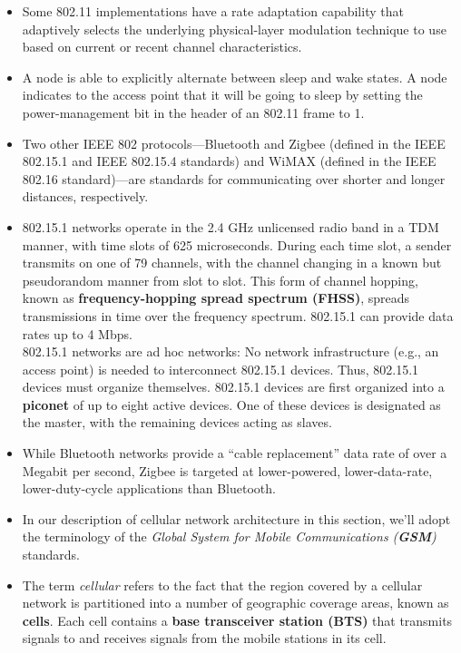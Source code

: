 \begin{itemize}
\item
Some 802.11 implementations have a rate adaptation capability that adaptively selects the underlying physical-layer modulation technique to use based on current or recent channel characteristics.

\item
A node is able to explicitly alternate between sleep and wake states. A node indicates to the access point that it will be going to sleep by setting the power-management bit in the header of an 802.11 frame to 1.

\item
Two other IEEE 802 protocols---Bluetooth and Zigbee (defined in the IEEE 802.15.1 and IEEE 802.15.4 standards) and WiMAX (defined in the IEEE 802.16 standard)---are standards for communicating over shorter and longer distances, respectively.

\item
802.15.1 networks operate in the 2.4 GHz unlicensed radio band in a TDM manner, with time slots of 625 microseconds. During each time slot, a sender transmits on one of 79 channels, with the channel changing in a known but pseudorandom manner from slot to slot. This form of channel hopping, known as \textbf{frequency-hopping spread spectrum (FHSS)}, spreads transmissions in time over the frequency spectrum. 802.15.1 can provide data rates up to 4 Mbps.\\
802.15.1 networks are ad hoc networks: No network infrastructure (e.g., an access point) is needed to interconnect 802.15.1 devices. Thus, 802.15.1 devices must organize themselves. 802.15.1 devices are first organized into a \textbf{piconet} of up to eight active devices. One of these devices is designated as the master, with the remaining devices acting as slaves.

\item
While Bluetooth networks provide a ``cable replacement'' data rate of over a Megabit per second, Zigbee is targeted at lower-powered, lower-data-rate, lower-duty-cycle applications than Bluetooth.

\item
In our description of cellular network architecture in this section, we'll adopt the terminology of the \textit{Global System for Mobile Communications (\textbf{GSM})} standards.

\item
The term \textit{cellular} refers to the fact that the region covered by a cellular network is partitioned into a number of geographic coverage areas, known as \textbf{cells}. Each cell contains a \textbf{base transceiver station (BTS)} that transmits signals to and receives signals from the mobile stations in its cell.


\end{itemize}
